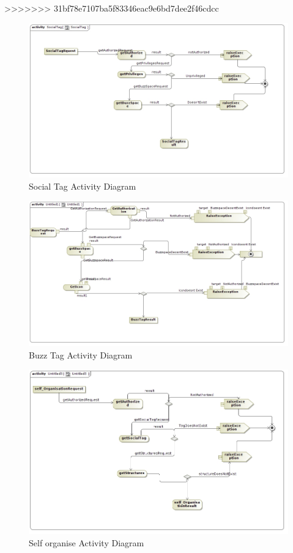 \documentclass[11pt]{article}
\begin{document}
>>>>>>> 31bf78e7107ba5f83346eac9e6bd7dee2f46cdcc
	\begin{figure}[H]	
\graphicspath{ {../Diagrams/sfiso/} }
    	\includegraphics[scale=0.5]{socialA.jpg}
    	\caption{Social Tag  Activity Diagram}
	\end{figure}
	\begin{figure}[H]	
\graphicspath{ {../Diagrams/sfiso/} }
    	\includegraphics[scale=0.5]{buzzA.jpg}
    	\caption{Buzz Tag  Activity Diagram}
	\end{figure}

	\begin{figure}[H]	
\graphicspath{ {../Diagrams/sfiso/} }
    	\includegraphics[scale=0.5]{selfA.jpg}
    	\caption{Self organise Activity Diagram}
	\end{figure}
\end{document}
